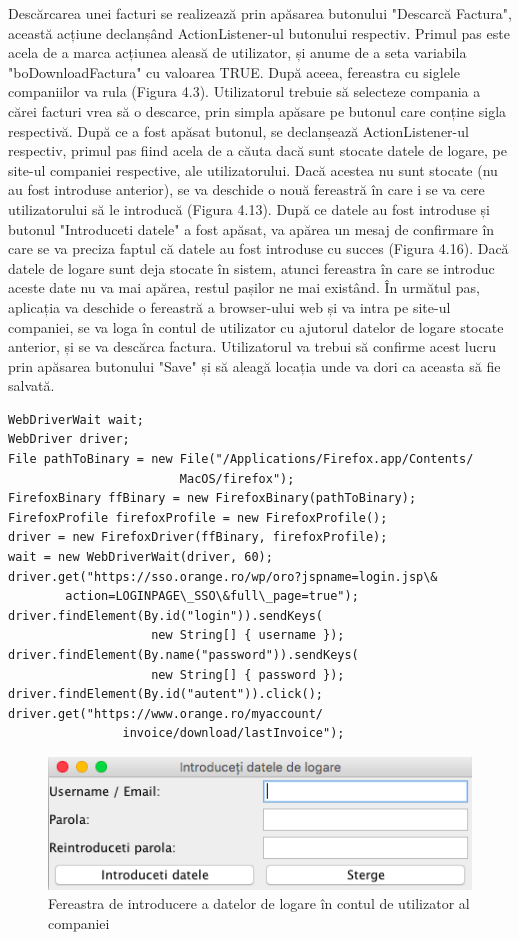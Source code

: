 \documentclass[12pt]{book}
\begin{document}
Descărcarea unei facturi se realizează prin apăsarea butonului "Descarcă Factura", această acțiune declanșând ActionListener-ul butonului respectiv.  Primul pas este acela de a marca acțiunea aleasă de utilizator, și anume de a seta variabila "boDownloadFactura" cu valoarea TRUE. După aceea, fereastra cu siglele companiilor va rula (Figura 4.3). Utilizatorul trebuie să selecteze compania a cărei facturi vrea să o descarce, prin simpla apăsare pe butonul care conține sigla respectivă. După ce a fost apăsat butonul, se declanșează ActionListener-ul respectiv, primul pas fiind acela de a căuta dacă sunt stocate datele de logare, pe site-ul companiei respective, ale utilizatorului. Dacă acestea nu sunt stocate (nu au fost introduse anterior), se va deschide o nouă fereastră în care i se va cere utilizatorului să le introducă (Figura 4.13). După ce datele au fost introduse și butonul "Introduceti datele" a fost apăsat, va apărea un mesaj de confirmare în care se va preciza faptul că datele au fost introduse cu succes (Figura 4.16). Dacă datele de logare sunt deja stocate în sistem, atunci fereastra în care se introduc aceste date nu va mai apărea, restul pașilor ne mai existând. În următul pas, aplicația va deschide o fereastră a browser-ului web și va intra pe site-ul companiei, se va loga în contul de utilizator cu ajutorul datelor de logare stocate anterior, și se va descărca factura. Utilizatorul va trebui să confirme acest lucru prin apăsarea butonului "Save" și să aleagă locația unde va dori ca aceasta să fie salvată.
\begin{lstlisting}[frame=single, caption=Utilizarea Selenium]
WebDriverWait wait;
WebDriver driver;
File pathToBinary = new File("/Applications/Firefox.app/Contents/
						MacOS/firefox");
FirefoxBinary ffBinary = new FirefoxBinary(pathToBinary);
FirefoxProfile firefoxProfile = new FirefoxProfile();
driver = new FirefoxDriver(ffBinary, firefoxProfile);
wait = new WebDriverWait(driver, 60);
driver.get("https://sso.orange.ro/wp/oro?jspname=login.jsp\&
		action=LOGINPAGE\_SSO\&full\_page=true");
driver.findElement(By.id("login")).sendKeys(
					new String[] { username });
driver.findElement(By.name("password")).sendKeys(
					new String[] { password });
driver.findElement(By.id("autent")).click();
driver.get("https://www.orange.ro/myaccount/
				invoice/download/lastInvoice");
\end{lstlisting}

\begin{figure}[!ht]
	\centering
	\includegraphics{IntroducereDateLogare}
	\caption{Fereastra de introducere a datelor de logare în contul de utilizator al companiei}
\end{figure}
\end{document}
